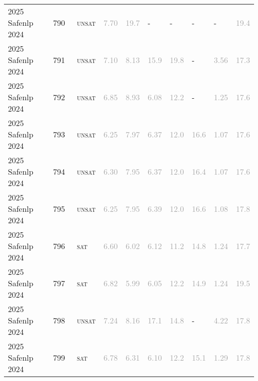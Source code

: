 \begin{center}
{\begin{longtable}{@{}llllllllll@{}}
2025 Safenlp 2024 & 790 & ~\textsc{unsat} & \textcolor{darkgray}{7.70} & \textcolor{darkgray}{19.7} & - & - & - & - & \textcolor{darkgray}{19.4} \\
2025 Safenlp 2024 & 791 & ~\textsc{unsat} & \textcolor{darkgray}{7.10} & \textcolor{darkgray}{8.13} & \textcolor{darkgray}{15.9} & \textcolor{darkgray}{19.8} & - & \textcolor{darkgray}{3.56} & \textcolor{darkgray}{17.3} \\
2025 Safenlp 2024 & 792 & ~\textsc{unsat} & \textcolor{darkgray}{6.85} & \textcolor{darkgray}{8.93} & \textcolor{darkgray}{6.08} & \textcolor{darkgray}{12.2} & - & \textcolor{darkgray}{1.25} & \textcolor{darkgray}{17.6} \\
2025 Safenlp 2024 & 793 & ~\textsc{unsat} & \textcolor{darkgray}{6.25} & \textcolor{darkgray}{7.97} & \textcolor{darkgray}{6.37} & \textcolor{darkgray}{12.0} & \textcolor{darkgray}{16.6} & \textcolor{darkgray}{1.07} & \textcolor{darkgray}{17.6} \\
2025 Safenlp 2024 & 794 & ~\textsc{unsat} & \textcolor{darkgray}{6.30} & \textcolor{darkgray}{7.95} & \textcolor{darkgray}{6.37} & \textcolor{darkgray}{12.0} & \textcolor{darkgray}{16.4} & \textcolor{darkgray}{1.07} & \textcolor{darkgray}{17.6} \\
2025 Safenlp 2024 & 795 & ~\textsc{unsat} & \textcolor{darkgray}{6.25} & \textcolor{darkgray}{7.95} & \textcolor{darkgray}{6.39} & \textcolor{darkgray}{12.0} & \textcolor{darkgray}{16.6} & \textcolor{darkgray}{1.08} & \textcolor{darkgray}{17.8} \\
2025 Safenlp 2024 & 796 & ~\textsc{sat} & \textcolor{darkgray}{6.60} & \textcolor{darkgray}{6.02} & \textcolor{darkgray}{6.12} & \textcolor{darkgray}{11.2} & \textcolor{darkgray}{14.8} & \textcolor{darkgray}{1.24} & \textcolor{darkgray}{17.7} \\
2025 Safenlp 2024 & 797 & ~\textsc{sat} & \textcolor{darkgray}{6.82} & \textcolor{darkgray}{5.99} & \textcolor{darkgray}{6.05} & \textcolor{darkgray}{12.2} & \textcolor{darkgray}{14.9} & \textcolor{darkgray}{1.24} & \textcolor{darkgray}{19.5} \\
2025 Safenlp 2024 & 798 & ~\textsc{unsat} & \textcolor{darkgray}{7.24} & \textcolor{darkgray}{8.16} & \textcolor{darkgray}{17.1} & \textcolor{darkgray}{14.8} & - & \textcolor{darkgray}{4.22} & \textcolor{darkgray}{17.8} \\
2025 Safenlp 2024 & 799 & ~\textsc{sat} & \textcolor{darkgray}{6.78} & \textcolor{darkgray}{6.31} & \textcolor{darkgray}{6.10} & \textcolor{darkgray}{12.2} & \textcolor{darkgray}{15.1} & \textcolor{darkgray}{1.29} & \textcolor{darkgray}{17.8} \\

\end{longtable}}
\end{center}
